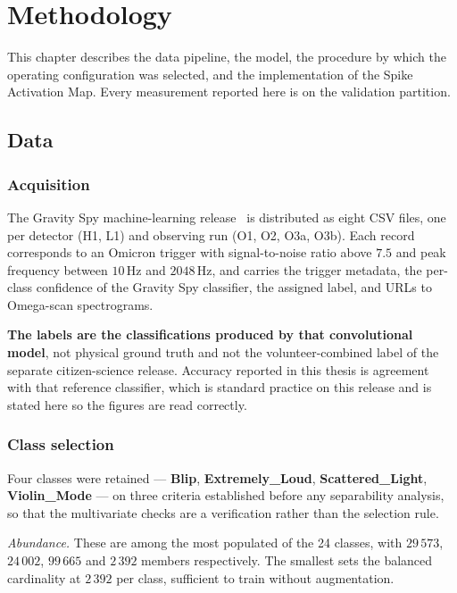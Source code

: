 \chapter{Methodology}
\label{ch:methodology}

This chapter describes the data pipeline, the model, the procedure by which the
operating configuration was selected, and the implementation of the Spike
Activation Map. Every measurement reported here is on the validation partition.

\section{Data}

\subsection{Acquisition}

The Gravity Spy machine-learning release~\cite{glanzer2021} is distributed as
eight CSV files, one per detector (H1, L1) and observing run (O1, O2, O3a, O3b).
Each record corresponds to an Omicron trigger with signal-to-noise ratio above
$7.5$ and peak frequency between $10$\,Hz and $2048$\,Hz, and carries the
trigger metadata, the per-class confidence of the Gravity Spy classifier, the
assigned label, and URLs to Omega-scan spectrograms.

\textbf{The labels are the classifications produced by that convolutional
model}, not physical ground truth and not the volunteer-combined label of the
separate citizen-science release. Accuracy reported in this thesis is agreement
with that reference classifier, which is standard practice on this release and
is stated here so the figures are read correctly.

\subsection{Class selection}

Four classes were retained --- \textbf{Blip}, \textbf{Extremely\_Loud},
\textbf{Scattered\_Light}, \textbf{Violin\_Mode} --- on three criteria
established before any separability analysis, so that the multivariate checks
are a verification rather than the selection rule.

\emph{Abundance.} These are among the most populated of the 24 classes, with
$29\,573$, $24\,002$, $99\,665$ and $2\,392$ members respectively. The smallest
sets the balanced cardinality at $2\,392$ per class, sufficient to train without
augmentation.


